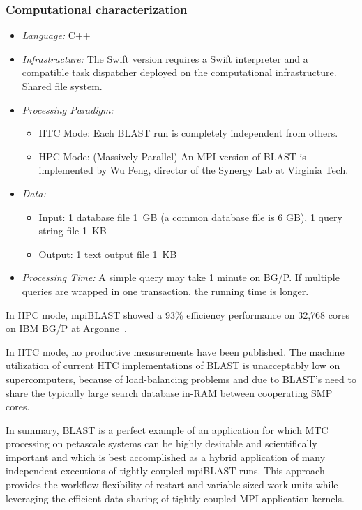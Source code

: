 \documentclass[10pt,letterpaper]{article}
\begin{document}
\subsubsection{Computational characterization}
\begin {itemize}
\item {\em Language:} C++
\item {\em Infrastructure:}  The Swift version requires a Swift interpreter and a compatible 
        task dispatcher deployed on the computational infrastructure.  
        Shared file system.
        
\item {\em Processing Paradigm:}
  \begin{itemize}
  \item HTC Mode: Each BLAST run is completely independent from others.
  \item HPC Mode: (Massively Parallel) An MPI version of BLAST is implemented by Wu Feng, director of the Synergy Lab at Virginia Tech.
  \end{itemize}

\item {\em Data:}
  \begin{itemize}
  \item Input: 1 database file 1~GB (a common database file is 6 GB), 1 query string file 1~KB
  \item Output: 1 text output file 1~KB
  \end{itemize}

\item {\em Processing Time:} A simple query may take 1 minute on BG/P. If multiple queries are wrapped in one transaction, the running time is longer.
\end{itemize}

In  HPC mode, mpiBLAST showed a 93\% efficiency performance on 32,768 cores on IBM BG/P at Argonne~\cite{mpiBLAST-SC-08}.

In  HTC mode, no productive measurements have been published. The machine utilization of current HTC implementations of BLAST is unacceptably low on supercomputers,
  because of load-balancing problems and due to BLAST's need to share the typically large search database in-RAM between cooperating SMP cores.~\cite{mpiBLAST-SC-08}

In summary, BLAST is a perfect example of an application for which MTC processing on petascale systems can be highly desirable and scientifically important and which is best accomplished as a hybrid application of many independent executions of tightly coupled mpiBLAST runs. This approach provides the workflow flexibility of restart and variable-sized work units while leveraging the efficient data sharing of tightly coupled MPI application kernels.
\end{document}
